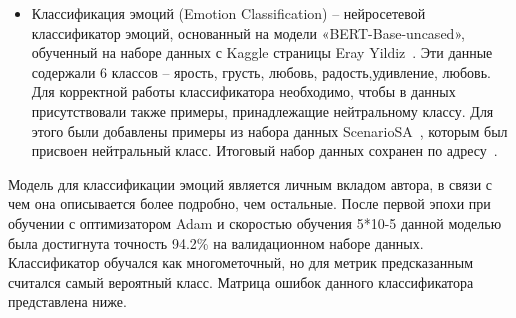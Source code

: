 \begin{itemize}
\item Классификация эмоций (Emotion Classification) --  нейросетевой классификатор эмоций, основанный на модели «BERT-Base-uncased», обученный на наборе данных с Kaggle страницы Eray Yildiz~\cite{na_website_ndp_emo}. Эти данные содержали 6 классов -- ярость, грусть, любовь, радость,удивление, любовь. Для корректной работы классификатора необходимо, чтобы в данных присутствовали также примеры, принадлежащие нейтральному классу. Для этого были добавлены примеры из набора данных ScenarioSA~\cite{scenariosa}, которым был присвоен нейтральный класс. Итоговый набор данных сохранен по адресу~\cite{na_website_ndo_emo}.
\end{itemize}
Модель для классификации эмоций является личным вкладом автора, в связи с чем она описывается более подробно, чем остальные. После первой эпохи при обучении с оптимизатором Adam и скоростью обучения 5*10-5 данной моделью была достигнута точность 94.2\% на валидационном наборе данных. Классификатор обучался как многометочный, но для метрик предсказанным считался самый вероятный класс. Матрица ошибок данного классификатора представлена ниже.


\begin{table}[htbp]
\centering
\caption {Матрица ошибок классификатора эмоций из Alexa Prize Challenge 3}
\label{tab:dream1}%
\end{table}



